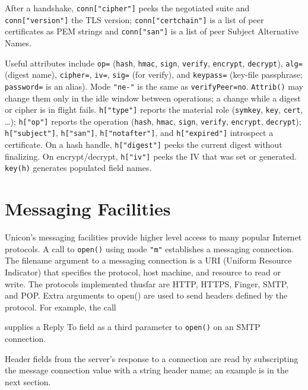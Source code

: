 After a handshake, \texttt{conn["cipher"]} peeks the negotiated
suite and \texttt{conn["version"]} the TLS version;
\texttt{conn["certchain"]} is a list of peer certificates
as PEM strings and \texttt{conn["san"]} is a list of peer
Subject Alternative Names.

Useful attributes include \texttt{op=} (\texttt{hash}, \texttt{hmac},
\texttt{sign}, \texttt{verify}, \texttt{encrypt}, \texttt{decrypt}),
\texttt{alg=} (digest name), \texttt{cipher=}, \texttt{iv=},
\texttt{sig=} (for verify), and \texttt{keypass=} (key-file passphrase;
\texttt{password=} is an alias). Mode \texttt{"ne-"} is the same as
\texttt{verifyPeer=no}. \texttt{Attrib()} may change them only in
the idle window between operations; a change while a digest or cipher
is in flight fails. \texttt{h["type"]} reports the material
role (\texttt{symkey}, \texttt{key}, \texttt{cert}, \ldots);
\texttt{h["op"]} reports the operation (\texttt{hash}, \texttt{hmac},
\texttt{sign}, \texttt{verify}, \texttt{encrypt}, \texttt{decrypt});
\texttt{h["subject"]}, \texttt{h["san"]}, \texttt{h["notafter"]}, and
\texttt{h["expired"]} introspect a certificate. On a hash handle, \texttt{h["digest"]} peeks
the current digest without finalizing. On encrypt/decrypt,
\texttt{h["iv"]} peeks the IV that was set or generated.
\texttt{key(h)} generates populated field names.

\section{Messaging Facilities}

Unicon's messaging facilities provide
higher level access to many popular Internet protocols. A call to
\texttt{open()} using mode \texttt{"m"}
establishes a messaging connection. The filename argument to a
messaging connection is a URI (Uniform Resource Indicator) that
specifies the protocol, host machine, and resource to read or write.
The protocols implemented thusfar are HTTP, HTTPS, Finger, SMTP, and POP.
Extra arguments to open() are used to send headers defined by the
protocol. For example, the call


\noindent
supplies a Reply To field as a third parameter to \texttt{open()} on an
SMTP connection.

Header fields from the server's response to a
connection are read by subscripting the message connection value
with a string header name; an example is in the next section.

